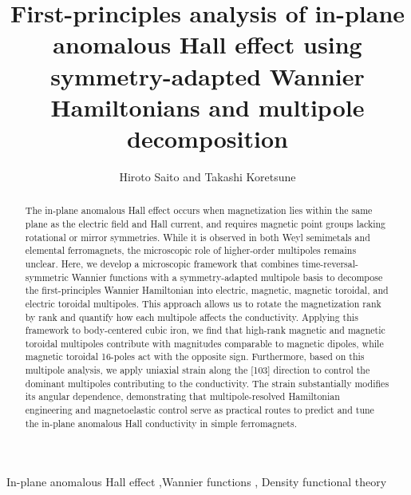 \documentclass[preprint,12pt]{elsarticle}
\begin{document}
\begin{frontmatter}
  \title{First-principles analysis of in-plane anomalous Hall effect
  using symmetry-adapted Wannier Hamiltonians and multipole decomposition}
  \author{Hiroto Saito and Takashi Koretsune}

  \begin{abstract}
    The in-plane anomalous Hall effect occurs when magnetization lies
    within the same plane as the electric field and Hall current, and
    requires magnetic point groups lacking rotational or mirror symmetries.
    While it is observed in both Weyl semimetals and elemental
    ferromagnets, the microscopic role of higher-order multipoles
    remains unclear.
    Here, we develop a microscopic framework that combines
    time-reversal-symmetric Wannier functions with a symmetry-adapted
    multipole basis to decompose the first-principles Wannier Hamiltonian into
    electric, magnetic, magnetic toroidal, and electric toroidal multipoles.
    This approach allows us to rotate the magnetization rank by rank
    and quantify how each multipole affects the conductivity.
    Applying this framework to body-centered cubic iron, we find that
    high-rank magnetic and magnetic toroidal multipoles contribute
    with magnitudes comparable to magnetic dipoles, while magnetic
    toroidal 16-poles
    act with the opposite sign.
    Furthermore, based on this multipole analysis, we apply
    uniaxial strain along the [103] direction to control the dominant
    multipoles contributing to the conductivity. The strain
    substantially modifies its angular dependence,
    demonstrating that
    multipole-resolved Hamiltonian
    engineering and magnetoelastic control serve as practical routes
    to predict and tune the in-plane anomalous Hall conductivity in
    simple ferromagnets.
  \end{abstract}
  \begin{keyword}
    In-plane anomalous Hall effect \sep Wannier functions \sep
    Density functional theory
  \end{keyword}
\end{frontmatter}
\end{document}

